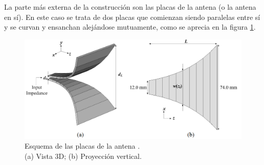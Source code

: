 \documentclass[11pt,a4paper,twoside,pdf]{article}
\numberwithin{equation}{section}
\begin{document}
La parte más externa de la construcción son las placas de la antena (o la antena en sí). En este caso se trata de dos placas que comienzan siendo paralelas entre sí y se curvan y ensanchan alejándose mutuamente, como se aprecia en la figura \ref{fig:esquemaPlacas}.
\begin{figure}[!h]
    \centering
    \includegraphics[width=\linewidth]{img/modelos/SoporteFeed/esquemaPlacas.png}
    \caption[Esquema de las placas de la antena \cite{tem_horn}.; (a) Vista 3D, (b) Proyección vertical.]
    {Esquema de las placas de la antena \cite{tem_horn}. \\ (a) Vista 3D; (b) Proyección vertical.\endtabular}
    \label{fig:esquemaPlacas}
\end{figure}
\end{document}
